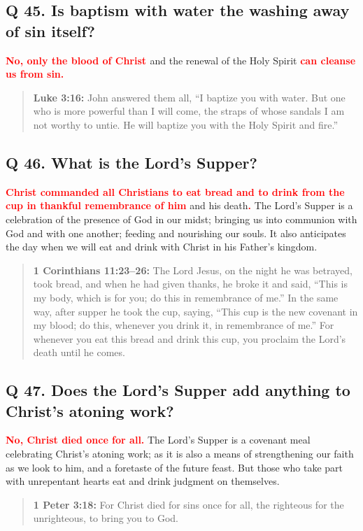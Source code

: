 \documentclass[]{memoir}
\newcommand\Children[1]{\textbf{\textcolor{red}{#1}}}
\newcommand\Quote[2]{\begin{quote}{\textbf{#1:}{ #2}}\end{quote}}
\begin{document}
\subsection{Q 45. Is baptism with water the washing away of sin itself?}
\Children{No, only the blood of Christ }and the renewal of the Holy Spirit \Children{can cleanse us from sin.}

\Quote{Luke 3:16}{John answered them all, ``I baptize you with water. But one who is more powerful than I will come, the straps of whose sandals I am not worthy to untie. He will baptize you with the Holy Spirit and fire.''}

\subsection{Q 46. What is the Lord's Supper?}
\Children{Christ commanded all Christians to eat bread and to drink from the cup in thankful remembrance of him} and his death\Children{.} The Lord's Supper is a celebration of the presence of God in our midst; bringing us into communion with God and with one another; feeding and nourishing our souls. It also anticipates the day when we will eat and drink with Christ in his Father's kingdom.

\Quote{1 Corinthians 11:23--26}{The Lord Jesus, on the night he was betrayed, took bread, and when he had given thanks, he broke it and said, ``This is my body, which is for you; do this in remembrance of me.'' In the same way, after supper he took the cup, saying, ``This cup is the new covenant in my blood; do this, whenever you drink it, in remembrance of me.'' For whenever you eat this bread and drink this cup, you proclaim the Lord's death until he comes.}

\subsection{Q 47. Does the Lord's Supper add anything to Christ's atoning work?}
\Children{No, Christ died once for all.} The Lord's Supper is a covenant meal celebrating Christ's atoning work; as it is also a means of strengthening our faith as we look to him, and a foretaste of the future feast. But those who take part with unrepentant hearts eat and drink judgment on themselves.

\Quote{1 Peter 3:18}{For Christ died for sins once for all, the righteous for the unrighteous, to bring you to God.}
\end{document}
